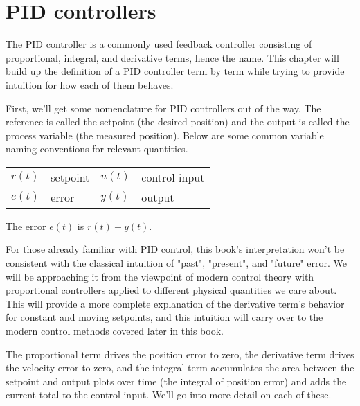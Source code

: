 
\chapter{PID controllers}

The PID controller is a commonly used feedback controller consisting of
proportional, integral, and derivative terms, hence the name. This chapter will
build up the definition of a PID controller term by term while trying to provide
intuition for how each of them behaves.

First, we'll get some nomenclature for PID controllers out of the way. The
\gls{reference} is called the \gls{setpoint} (the desired position) and the
\gls{output} is called the \gls{process variable} (the measured position). Below
are some common variable naming conventions for relevant quantities.
\begin{figurekey}
  \begin{tabular}{llll}
    $r(t)$ & \gls{setpoint} & $u(t)$ & \gls{control input} \\
    $e(t)$ & \gls{error} & $y(t)$ & \gls{output}
  \end{tabular}
\end{figurekey}

The \gls{error} $e(t)$ is $r(t) - y(t)$.

For those already familiar with PID control, this book's interpretation won't be
consistent with the classical intuition of "past", "present", and "future"
error. We will be approaching it from the viewpoint of modern control theory
with proportional controllers applied to different physical quantities we care
about. This will provide a more complete explanation of the derivative term's
behavior for constant and moving \glspl{setpoint}, and this intuition will carry
over to the modern control methods covered later in this book.

The proportional term drives the position error to zero, the derivative term
drives the velocity error to zero, and the integral term accumulates the area
between the \gls{setpoint} and \gls{output} plots over time (the integral of
position \gls{error}) and adds the current total to the \gls{control input}.
We'll go into more detail on each of these.

\renewcommand*{\chapterpath}{\partpath/pid-controllers}








